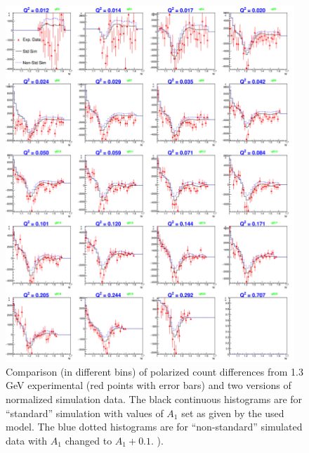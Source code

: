 \begin{figure}[H] %
  \leavevmode \includegraphics[width=0.97\textwidth]{figuresEG4/FigAnal/xsDiff_StdD79_nStdD80C71S181Eb7Wbins70NZmd.png}
  \caption[$\Delta n$ for data and simulation]{Comparison (in different \qsqs bins) of polarized count differences from 1.3 GeV experimental (red points with error bars) and two versions of normalized simulation data. The black continuous histograms are for ``standard'' simulation with values of $A_1$ set as given by the used model. The blue dotted histograms are for ``non-standard'' simulated data with $A_1$ changed to $A_1 + 0.1$. ). %
  }
  \label{xsComp7}  %
\end{figure}


